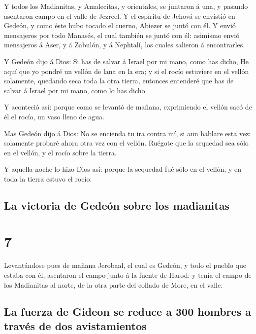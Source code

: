  Y todos los Madianitas, y Amalecitas, y orientales, se
juntaron á una, y pasando asentaron campo en el valle de Jezreel.
 Y el espíritu de Jehová se envistió en Gedeón, y como
éste hubo tocado el cuerno, Abiezer se juntó con él.  Y
envió mensajeros por todo Manasés, el cual también se juntó con él:
asimismo envió mensajeros á Aser, y á Zabulón, y á Nephtalí, los cuales
salieron á encontrarles.

 Y Gedeón dijo á Dios: Si has de salvar á Israel por mi
mano, como has dicho,  He aquí que yo pondré un vellón de
lana en la era; y si el rocío estuviere en el vellón solamente, quedando
seca toda la otra tierra, entonces entenderé que has de salvar á Israel
por mi mano, como lo has dicho.

 Y aconteció así: porque como se levantó de mañana,
exprimiendo el vellón sacó de él el rocío, un vaso lleno de agua.

 Mas Gedeón dijo á Dios: No se encienda tu ira contra mí,
si aun hablare esta vez: solamente probaré ahora otra vez con el vellón.
Ruégote que la sequedad sea sólo en el vellón, y el rocío sobre la
tierra.

 Y aquella noche lo hizo Dios así: porque la sequedad fué
sólo en el vellón, y en toda la tierra estuvo el rocío.

\hypertarget{la-victoria-de-gedeuxf3n-sobre-los-madianitas}{%
\subsection{La victoria de Gedeón sobre los
madianitas}\label{la-victoria-de-gedeuxf3n-sobre-los-madianitas}}

\hypertarget{section-6}{%
\section{7}\label{section-6}}

 Levantándose pues de mañana Jerobaal, el cual es Gedeón,
y todo el pueblo que estaba con él, asentaron el campo junto á la fuente
de Harod: y tenía el campo de los Madianitas al norte, de la otra parte
del collado de More, en el valle.

\hypertarget{la-fuerza-de-gideon-se-reduce-a-300-hombres-a-travuxe9s-de-dos-avistamientos}{%
\subsection{La fuerza de Gideon se reduce a 300 hombres a través de dos
avistamientos}\label{la-fuerza-de-gideon-se-reduce-a-300-hombres-a-travuxe9s-de-dos-avistamientos}}

